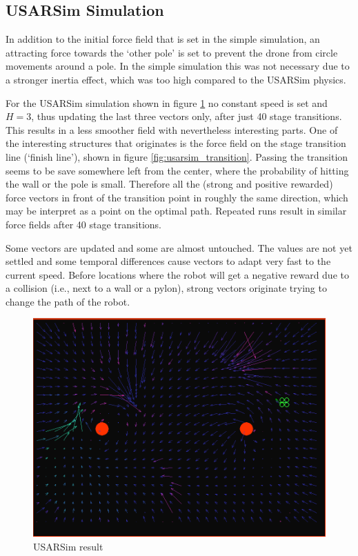 \documentclass[11pt]{article}
\begin{document}
\subsection{USARSim Simulation}

In addition to the initial force field that is set in the simple simulation, an attracting force towards the `other pole' is set to prevent the drone from circle movements around a pole. In the simple simulation this was not necessary due to a stronger inertia effect, which was too high compared to the USARSim physics.

For the USARSim simulation shown in figure \ref{fig:usarsim_result1} no constant speed is set and $H = 3$, thus updating the last three vectors only, after just 40 stage transitions. This results in a less smoother field with nevertheless interesting parts. One of the interesting structures that originates is the force field on the stage transition line (`finish line'), shown in figure \ref{fig:usarsim_transition}. Passing the transition seems to be save somewhere left from the center, where the probability of hitting the wall or the pole is small. Therefore all the (strong and positive rewarded) force vectors in front of the transition point in roughly the same direction, which may be interpret as a point on the optimal path. Repeated runs result in similar force fields after 40 stage transitions.

Some vectors are updated and some are almost untouched. The values are not yet settled and some temporal differences cause vectors to adapt very fast to the current speed. Before locations where the robot will get a negative reward due to a collision (i.e., next to a wall or a pylon), strong vectors originate trying to change the path of the robot.


  \begin{figure}
    \includegraphics[width=1.0\textwidth]{img/usarsim_result1}
    \caption{USARSim result}
    \label{fig:usarsim_result1}
  \end{figure}
\end{document}
